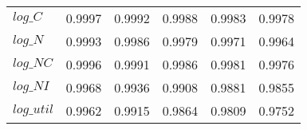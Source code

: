 \begin{center}
\begin{longtable}{lccccc}
$log\_C     $	 & 	     0.9997	 & 	     0.9992	 & 	     0.9988	 & 	     0.9983	 & 	     0.9978 \\ 
$log\_N     $	 & 	     0.9993	 & 	     0.9986	 & 	     0.9979	 & 	     0.9971	 & 	     0.9964 \\ 
$log\_NC    $	 & 	     0.9996	 & 	     0.9991	 & 	     0.9986	 & 	     0.9981	 & 	     0.9976 \\ 
$log\_NI    $	 & 	     0.9968	 & 	     0.9936	 & 	     0.9908	 & 	     0.9881	 & 	     0.9855 \\ 
$log\_util  $	 & 	     0.9962	 & 	     0.9915	 & 	     0.9864	 & 	     0.9809	 & 	     0.9752 \\ 
\end{longtable}
 \end{center}
